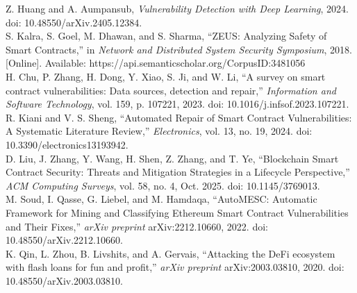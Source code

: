 \documentclass[conference]{IEEEtran}
\begin{document}
\noindent [9] Z. Huang and A. Aumpansub, \textit{Vulnerability Detection with Deep Learning}, 2024. doi: 10.48550/arXiv.2405.12384. \\[4pt]
\noindent [10] S. Kalra, S. Goel, M. Dhawan, and S. Sharma, ``ZEUS: Analyzing Safety of Smart Contracts,'' in \textit{Network and Distributed System Security Symposium}, 2018. [Online]. Available: https://api.semanticscholar.org/CorpusID:3481056 \\[4pt]
\noindent [11] H. Chu, P. Zhang, H. Dong, Y. Xiao, S. Ji, and W. Li, ``A survey on smart contract vulnerabilities: Data sources, detection and repair,'' \textit{Information and Software Technology}, vol. 159, p. 107221, 2023. doi: 10.1016/j.infsof.2023.107221. \\[4pt]
\noindent [12] R. Kiani and V. S. Sheng, ``Automated Repair of Smart Contract Vulnerabilities: A Systematic Literature Review,'' \textit{Electronics}, vol. 13, no. 19, 2024. doi: 10.3390/electronics13193942. \\[4pt]
\noindent [13] D. Liu, J. Zhang, Y. Wang, H. Shen, Z. Zhang, and T. Ye, ``Blockchain Smart Contract Security: Threats and Mitigation Strategies in a Lifecycle Perspective,'' \textit{ACM Computing Surveys}, vol. 58, no. 4, Oct. 2025. doi: 10.1145/3769013. \\[4pt]
\noindent [14] M. Soud, I. Qasse, G. Liebel, and M. Hamdaqa, ``AutoMESC: Automatic Framework for Mining and Classifying Ethereum Smart Contract Vulnerabilities and Their Fixes,'' \textit{arXiv preprint} arXiv:2212.10660, 2022. doi: 10.48550/arXiv.2212.10660. \\[4pt]
\noindent [15] K. Qin, L. Zhou, B. Livshits, and A. Gervais, ``Attacking the DeFi ecosystem with flash loans for fun and profit,'' \textit{arXiv preprint} arXiv:2003.03810, 2020. doi: 10.48550/arXiv.2003.03810.
\end{document}

